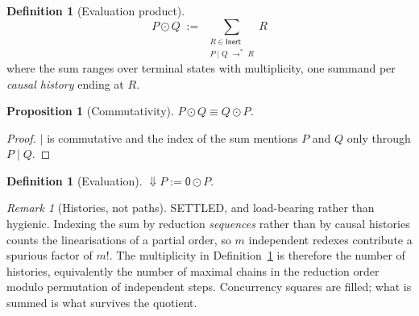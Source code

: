 \documentclass[11pt]{article}
\newtheorem{proposition}[theorem]{Proposition}
\theoremstyle{definition}
\newtheorem{definition}[theorem]{Definition}
\theoremstyle{remark}
\newtheorem{remark}[theorem]{Remark}
\newcommand{\pzero}{\mathsf{0}}
\newcommand{\scong}{\ensuremath{\equiv}}
\newcommand{\red}{\ensuremath{\rightarrow}}
\begin{document}
\begin{definition}[Evaluation product]
\label{def:odot}
\[
  P \odot Q \;:=\; \sum_{\substack{R \in \mathsf{Inert} \\ P \mid Q \;\red^{*}\; R}} R
\]
where the sum ranges over terminal states with multiplicity, one summand per
\emph{causal history} ending at $R$.
\end{definition}

\begin{proposition}[Commutativity]
\label{prop:odotcomm}
$P \odot Q \scong Q \odot P$.
\end{proposition}

\begin{proof}
$\mid$ is commutative and the index of the sum mentions $P$ and $Q$ only through
$P \mid Q$.
\end{proof}

\begin{definition}[Evaluation]
\label{def:eval}
$\Downarrow P := \pzero \odot P$.
\end{definition}

\begin{remark}[Histories, not paths]
\label{rem:histories}
SETTLED, and load-bearing rather than hygienic. Indexing the sum by reduction
\emph{sequences} rather than by causal histories counts the linearisations of a
partial order, so $m$ independent redexes contribute a spurious factor of $m!$.
The multiplicity in Definition~\ref{def:odot} is therefore the number of
histories, equivalently the number of maximal chains in the reduction order
modulo permutation of independent steps. Concurrency squares are filled; what is
summed is what survives the quotient.
\end{remark}
\end{document}
